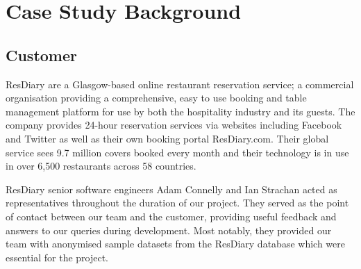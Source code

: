 \documentclass{l3proj}
\begin{document}
\newpage



\section{Case Study Background}
\label{sec:background}

\subsection{Customer}
\label{sec:customer}


ResDiary are a Glasgow-based online restaurant reservation service; a commercial organisation providing a comprehensive, easy to use booking and table management platform for use by both the hospitality industry and its guests. The company provides 24-hour reservation services via websites including Facebook and Twitter as well as their own booking portal ResDiary.com. Their global service sees 9.7 million covers booked every month and their technology is in use in over 6,500 restaurants across 58 countries.

ResDiary senior software engineers Adam Connelly and Ian Strachan acted as representatives throughout the duration of our project. They served as the point of contact between our team and the customer, providing useful feedback and answers to our queries during development. Most notably, they provided our team with anonymised sample datasets from the ResDiary database which were essential for the project.
\end{document}
